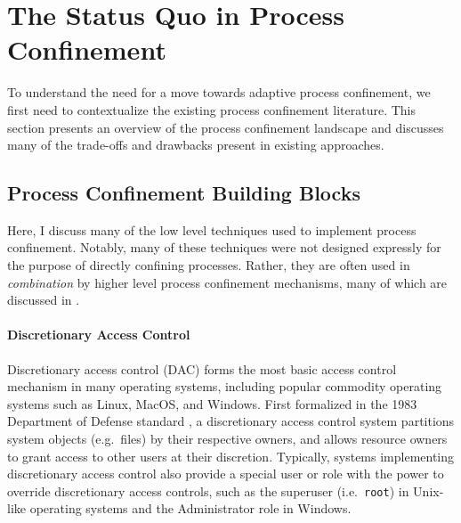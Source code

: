 \documentclass[dvipsnames, 12pt]{article}
\begin{document}
\section{The Status Quo in Process Confinement}
\label{sec:status_quo}

To understand the need for a move towards adaptive process confinement, we first
need to contextualize the existing process confinement literature. This section
presents an overview of the process confinement landscape and discusses many
of the trade-offs and drawbacks present in existing approaches.


\subsection{Process Confinement Building Blocks}
\label{sec:low-level}

Here, I discuss many of the low level techniques used to implement
process confinement. Notably, many of these techniques were not designed
expressly for the purpose of directly confining processes. Rather, they are
often used in \textit{combination} by higher level process confinement
mechanisms, many of which are discussed in .


\paragraph*{Discretionary Access Control}
Discretionary access control (DAC) forms the most basic access control mechanism
in many operating systems, including popular commodity operating systems such as
Linux, MacOS, and Windows.  First formalized in the 1983 Department of Defense
standard \cite{orange_book}, a discretionary access control system partitions
system objects (e.g.~files) by their respective owners, and allows resource
owners to grant access to other users at their discretion.  Typically, systems
implementing discretionary access control also provide a special user or role
with the power to override discretionary access controls, such as the superuser
(i.e.~\texttt{root}) in Unix-like operating systems and the Administrator role
in Windows.
\end{document}
